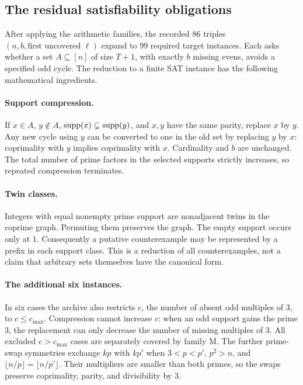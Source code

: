 \subsection{The residual satisfiability obligations}
After applying the arithmetic families, the recorded $86$ triples $(n,b,\text{first uncovered }\ell)$ expand to $99$ required target instances. Each asks whether a set $A\subseteq[n]$ of size $T+1$, with exactly $b$ missing evens, avoids a specified odd cycle. The reduction to a finite SAT instance has the following mathematical ingredients.

\paragraph{Support compression.}
If $x\in A$, $y\notin A$, $\operatorname{supp}(x)\subsetneq\operatorname{supp}(y)$, and $x,y$ have the same parity, replace $x$ by $y$. Any new cycle using $y$ can be converted to one in the old set by replacing $y$ by $x$: coprimality with $y$ implies coprimality with $x$. Cardinality and $b$ are unchanged. The total number of prime factors in the selected supports strictly increases, so repeated compression terminates.

\paragraph{Twin classes.}
Integers with equal nonempty prime support are nonadjacent twins in the coprime graph. Permuting them preserves the graph. The empty support occurs only at $1$. Consequently a putative counterexample may be represented by a prefix in each support class. This is a reduction of all counterexamples, not a claim that arbitrary sets themselves have the canonical form.

\paragraph{The additional six instances.}
In six cases the archive also restricts $c$, the number of absent odd multiples of $3$, to $c\le c_{\max}$. Compression cannot increase $c$: when an odd support gains the prime $3$, the replacement can only decrease the number of missing multiples of $3$. All excluded $c>c_{\max}$ cases are separately covered by family M. The further prime-swap symmetries exchange $kp$ with $kp'$ when $3<p<p'$, $p^2>n$, and $\lfloor n/p\rfloor=\lfloor n/p'\rfloor$. Their multipliers are smaller than both primes, so the swaps preserve coprimality, parity, and divisibility by $3$.

